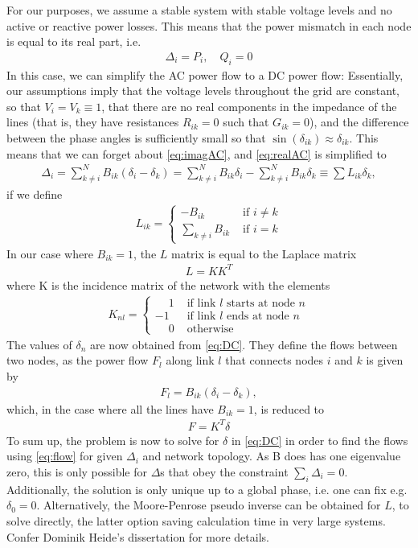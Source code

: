 \documentclass[english,twoside,a4paper,11pt]{article}
\numberwithin{equation}{section}
\begin{document}
For our purposes, we assume a stable system with stable voltage
levels and no active or reactive power losses. This means that the
power mismatch in each node is equal to its real part, i.e.
\begin{align*}
\Delta_i= P_i,\quad Q_i = 0
\end{align*}
In this case, we can
simplify the AC power flow to a DC power flow: Essentially, our
assumptions imply that the voltage levels throughout the grid are
constant, so that $V_i=V_k\equiv 1$, that there are no real components
in the impedance of the lines (that is, they have resistances
$R_{ik}=0$ such that $G_{ik} =0$), and the difference between the
phase angles is sufficiently small so that $\sin(\delta_{ik} )\approx
\delta_{ik}$. This means that we can forget about \eqref{eq:imagAC}, and
\eqref{eq:realAC} is simplified to
\begin{align}
\Delta_i=\sum_{k\neq i}^N B_{ik}(\delta_i-\delta_k)
=\sum_{k\neq i}^N B_{ik}\delta_i - \sum_{k\neq i}^N B_{ik}\delta_k
\equiv \sum L_{ik}\delta_k,
\label{eq:DC}
\end{align}
if we define
\begin{align*}
L_{ik} =\begin{cases} -B_{ik} & \text{ if $i\neq k$} \\
 \sum_{k\neq i}B_{ik} & \text{ if $i = k$}
\end{cases}
\end{align*}
In our case where $B_{ik}=1$, the $L$ matrix is equal to the
Laplace matrix
\begin{align*}
L=K K^T
\end{align*}
where K is the incidence matrix of the network with the elements
\begin{align*}
K_{nl} = \begin{cases}
\phantom{-} 1 & \text{ if link $l$ starts at node $n$} \\
-1 & \text{ if link $l$ ends at node $n$} \\
\phantom{-} 0 & \text{ otherwise}
\end{cases}
\end{align*}
The values of $\delta_n$ are now obtained from \eqref{eq:DC}. They
define the flows between two nodes, as the power flow $F_l$ along link
$l$ that connects nodes $i$ and $k$ is given by 
\begin{align*}
F_l =B_{ik} (\delta_i-\delta_k ),
\end{align*}
which, in the case where all the lines have $B_{ik} =1$, is reduced to
\begin{align}
F= K^T\delta
\label{eq:flow}
\end{align}
To sum up, the problem is now to solve for $\delta$ in \eqref{eq:DC}
in order to find the flows using \eqref{eq:flow} for given $\Delta_i$ and
network topology. As B does has one eigenvalue zero, this is only
possible for $\Delta$s that obey the constraint $\sum_i
\Delta_i=0$. Additionally, the solution is only unique up to a global
phase, i.e. one can fix e.g. $\delta_0=0$. Alternatively, the
Moore-Penrose pseudo inverse can be obtained for $L$, to solve
directly, the latter option saving calculation time in very large
systems. Confer Dominik Heide's dissertation for more details.
\end{document}
